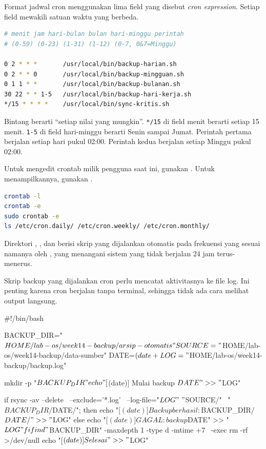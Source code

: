 Format jadwal cron menggunakan lima field yang disebut \emph{cron expression}.
Setiap field mewakili satuan waktu yang berbeda.

\begin{lstlisting}[language=bash, caption={Format cron expression dan contoh jadwal}]
# menit jam hari-bulan bulan hari-minggu perintah
# (0-59) (0-23) (1-31) (1-12) (0-7, 0&7=Minggu)

0 2 * * *       /usr/local/bin/backup-harian.sh
0 2 * * 0       /usr/local/bin/backup-mingguan.sh
0 1 1 * *       /usr/local/bin/backup-bulanan.sh
30 22 * * 1-5   /usr/local/bin/backup-hari-kerja.sh
*/15 * * * *    /usr/local/bin/sync-kritis.sh
\end{lstlisting}

Bintang berarti ``setiap nilai yang mungkin''. \texttt{*/15} di field menit
berarti setiap 15 menit. \texttt{1-5} di field hari-minggu berarti Senin sampai
Jumat. Perintah pertama berjalan setiap hari pukul 02:00. Perintah kedua berjalan
setiap Minggu pukul 02:00.

Untuk mengedit crontab milik pengguna saat ini, gunakan .
Untuk menampilkannya, gunakan .

\begin{lstlisting}[language=bash, caption={Mengelola crontab}]
crontab -l
crontab -e
sudo crontab -e
ls /etc/cron.daily/ /etc/cron.weekly/ /etc/cron.monthly/
\end{lstlisting}

Direktori , , dan
 berisi skrip yang dijalankan otomatis pada frekuensi
yang sesuai namanya oleh , yang menangani sistem yang tidak berjalan
24 jam terus-menerus.

Skrip backup yang dijalankan cron perlu mencatat aktivitasnya ke file log. Ini
penting karena cron berjalan tanpa terminal, sehingga tidak ada cara melihat
output langsung.

\begin{longlisting}[language=bash, caption={Contoh skrip backup dengan logging}]
#!/bin/bash

BACKUP_DIR="$HOME/lab-os/week14-backup/arsip-otomatis"
SOURCE="$HOME/lab-os/week14-backup/data-sumber"
DATE=$(date +%
LOG="$HOME/lab-os/week14-backup/backup.log"

mkdir -p "$BACKUP_DIR"

echo "[$(date)] Mulai backup $DATE" >> "$LOG"

if rsync -av --delete \
    --exclude='*.log' \
    --log-file="$LOG" \
    "$SOURCE/" \
    "$BACKUP_DIR/$DATE/"; then
    echo "[$(date)] Backup berhasil: $BACKUP_DIR/$DATE/" >> "$LOG"
else
    echo "[$(date)] GAGAL: backup $DATE" >> "$LOG"
fi

find "$BACKUP_DIR" -maxdepth 1 -type d -mtime +7 \
    -exec rm -rf {} >/dev/null
echo "[$(date)] Selesai" >> "$LOG"
\end{longlisting}

